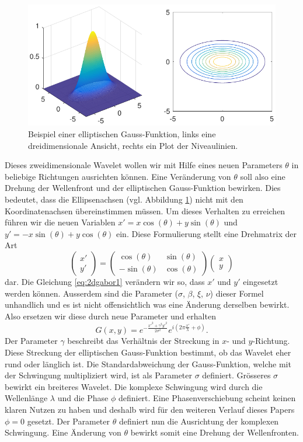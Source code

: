 \begin{figure}
	\centering
	\includegraphics[width=0.7\linewidth]{./papers/visuell/images/2d_gauss.pdf}
	\caption{Beispiel einer elliptischen Gauss-Funktion, links eine dreidimensionale Ansicht, rechts ein Plot der Niveaulinien.}
	\label{fig:2d_gauss}
\end{figure}

Dieses zweidimensionale Wavelet wollen wir mit Hilfe eines neuen Parameters $\theta$ in beliebige Richtungen ausrichten können.
Eine Veränderung von $\theta$ soll also eine Drehung der Wellenfront und der elliptischen Gauss-Funktion bewirken.
Dies bedeutet, dass die Ellipsenachsen (vgl. Abbildung \ref{fig:2d_gauss}) nicht mit den Koordinatenachsen übereinstimmen müssen. 
Um dieses Verhalten zu erreichen führen wir die neuen Variablen $x'=x\cos(\theta)+y\sin(\theta)$ und $y'=-x\sin(\theta)+y\cos(\theta)$ ein.
Diese Formulierung stellt eine Drehmatrix der Art
\begin{equation}
\begin{pmatrix}
x' \\
y'
\end{pmatrix}
=
\begin{pmatrix}
\cos(\theta) & \sin(\theta) \\
-\sin(\theta) & \cos(\theta)
\end{pmatrix}
\begin{pmatrix}
x \\
y
\end{pmatrix}
\end{equation}
dar.
Die Gleichung \ref{eq:2dgabor1} verändern wir so, dass $x'$ und $y'$ eingesetzt werden können.
Ausserdem sind die Parameter ($\sigma$, $\beta$, $\xi$, $\nu$) dieser Formel unhandlich und es ist nicht offensichtlich was eine Änderung derselben bewirkt.
Also ersetzen wir diese durch neue Parameter und erhalten 
\begin{equation}
G(x,y)=e^{-\frac{x'^{2}+\gamma^{2}y'^{2}}{2\sigma^{2}}}
e^{i(2\pi\frac{x'}{\lambda} + \phi)}.
\end{equation} 
Der Parameter $\gamma$ beschreibt das Verhältnis der Streckung in $x$- und $y$-Richtung.
Diese Streckung der elliptischen Gauss-Funktion bestimmt, ob das Wavelet eher rund oder länglich ist.
Die Standardabweichung der Gauss-Funktion, welche mit der Schwingung multipliziert wird, ist als Parameter $\sigma$ definiert.
Grösseres $\sigma$ bewirkt ein breiteres Wavelet.
Die komplexe Schwingung wird durch die Wellenlänge $\lambda$ und die Phase $\phi$ definiert.
Eine Phasenverschiebung scheint keinen klaren Nutzen zu haben und deshalb  wird für den weiteren Verlauf dieses Papers $\phi=0$ gesetzt.
Der Parameter $\theta$ definiert nun die Ausrichtung der komplexen Schwingung.
Eine Änderung von $\theta$  bewirkt somit eine Drehung der Wellenfronten.

